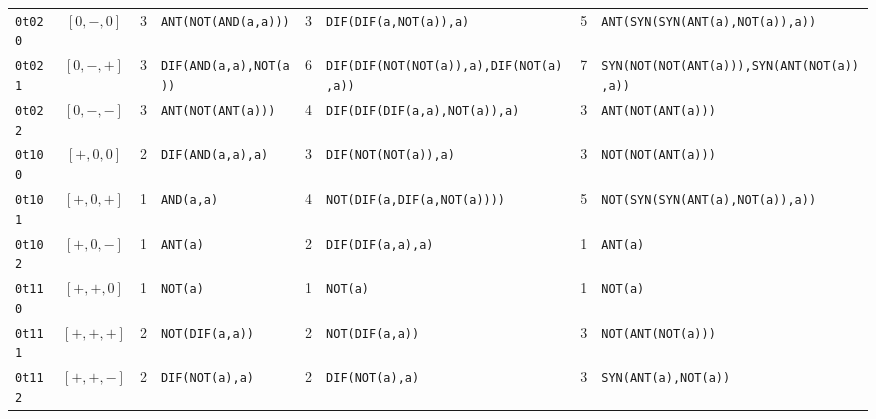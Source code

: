 \documentclass[10pt,a4paper]{article}
\begin{document}
\begin{landscape}
\begin{center}
\begin{longtable}{lcc>{\raggedright\arraybackslash}p{4.6cm}c>{\raggedright\arraybackslash}p{4.6cm}c>{\raggedright\arraybackslash}p{4.4cm}}
\texttt{0t020}&$[0,-,0]$&3&\texttt{ANT(\allowbreak NOT(\allowbreak AND(\allowbreak a,\allowbreak a)))}&3&\texttt{DIF(\allowbreak DIF(\allowbreak a,\allowbreak NOT(\allowbreak a)),\allowbreak a)}&5&\texttt{ANT(\allowbreak SYN(\allowbreak SYN(\allowbreak ANT(\allowbreak a),\allowbreak NOT(\allowbreak a)),\allowbreak a))}\\
\texttt{0t021}&$[0,-,+]$&3&\texttt{DIF(\allowbreak AND(\allowbreak a,\allowbreak a),\allowbreak NOT(\allowbreak a))}&6&\texttt{DIF(\allowbreak DIF(\allowbreak NOT(\allowbreak NOT(\allowbreak a)),\allowbreak a),\allowbreak DIF(\allowbreak NOT(\allowbreak a),\allowbreak a))}&7&\texttt{SYN(\allowbreak NOT(\allowbreak NOT(\allowbreak ANT(\allowbreak a))),\allowbreak SYN(\allowbreak ANT(\allowbreak NOT(\allowbreak a)),\allowbreak a))}\\
\texttt{0t022}&$[0,-,-]$&3&\texttt{ANT(\allowbreak NOT(\allowbreak ANT(\allowbreak a)))}&4&\texttt{DIF(\allowbreak DIF(\allowbreak DIF(\allowbreak a,\allowbreak a),\allowbreak NOT(\allowbreak a)),\allowbreak a)}&3&\texttt{ANT(\allowbreak NOT(\allowbreak ANT(\allowbreak a)))}\\
\texttt{0t100}&$[+,0,0]$&2&\texttt{DIF(\allowbreak AND(\allowbreak a,\allowbreak a),\allowbreak a)}&3&\texttt{DIF(\allowbreak NOT(\allowbreak NOT(\allowbreak a)),\allowbreak a)}&3&\texttt{NOT(\allowbreak NOT(\allowbreak ANT(\allowbreak a)))}\\
\texttt{0t101}&$[+,0,+]$&1&\texttt{AND(\allowbreak a,\allowbreak a)}&4&\texttt{NOT(\allowbreak DIF(\allowbreak a,\allowbreak DIF(\allowbreak a,\allowbreak NOT(\allowbreak a))))}&5&\texttt{NOT(\allowbreak SYN(\allowbreak SYN(\allowbreak ANT(\allowbreak a),\allowbreak NOT(\allowbreak a)),\allowbreak a))}\\
\texttt{0t102}&$[+,0,-]$&1&\texttt{ANT(\allowbreak a)}&2&\texttt{DIF(\allowbreak DIF(\allowbreak a,\allowbreak a),\allowbreak a)}&1&\texttt{ANT(\allowbreak a)}\\
\texttt{0t110}&$[+,+,0]$&1&\texttt{NOT(\allowbreak a)}&1&\texttt{NOT(\allowbreak a)}&1&\texttt{NOT(\allowbreak a)}\\
\texttt{0t111}&$[+,+,+]$&2&\texttt{NOT(\allowbreak DIF(\allowbreak a,\allowbreak a))}&2&\texttt{NOT(\allowbreak DIF(\allowbreak a,\allowbreak a))}&3&\texttt{NOT(\allowbreak ANT(\allowbreak NOT(\allowbreak a)))}\\
\texttt{0t112}&$[+,+,-]$&2&\texttt{DIF(\allowbreak NOT(\allowbreak a),\allowbreak a)}&2&\texttt{DIF(\allowbreak NOT(\allowbreak a),\allowbreak a)}&3&\texttt{SYN(\allowbreak ANT(\allowbreak a),\allowbreak NOT(\allowbreak a))}\\

\end{longtable}
\end{center}
\end{landscape}
\end{document}
